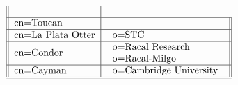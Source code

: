 \begin{table}
\[\begin{tabular}{||l|l||}
\begin{tabular}{l}
           \end{tabular}\\ \hline
cn=Toucan
           &\begin{tabular}{l}
           \end{tabular}\\ \hline
cn=La Plata Otter
           &\begin{tabular}{l}
           o=STC \\
           \end{tabular}\\ \hline
cn=Condor
           &\begin{tabular}{l}
           o=Racal Research \\
           o=Racal-Milgo \\
           \end{tabular}\\ \hline
cn=Cayman
           &\begin{tabular}{l}
	   o=Cambridge University
           \end{tabular}\\ \hline
\hline
\end{tabular}
\]
\end{table}

